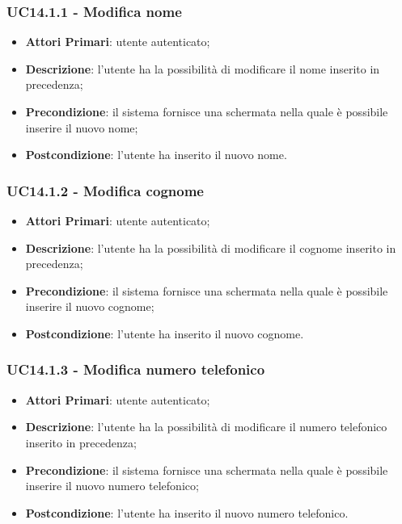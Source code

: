 \subsubsection{UC14.1.1 - Modifica nome}
\begin{itemize}
	\item \textbf{Attori Primari}: utente autenticato;
	\item \textbf{Descrizione}: l'utente ha la possibilità di modificare il nome inserito in precedenza;
	\item \textbf{Precondizione}: il sistema fornisce una schermata nella quale è possibile inserire il nuovo nome;
	\item \textbf{Postcondizione}: l'utente ha inserito il nuovo nome.
\end{itemize}

\subsubsection{UC14.1.2 - Modifica cognome}
\begin{itemize}
	\item \textbf{Attori Primari}: utente autenticato;
	\item \textbf{Descrizione}: l'utente ha la possibilità di modificare il cognome inserito in precedenza;
	\item \textbf{Precondizione}: il sistema fornisce una schermata nella quale è possibile inserire il nuovo cognome;
	\item \textbf{Postcondizione}: l'utente ha inserito il nuovo cognome.
\end{itemize}

\subsubsection{UC14.1.3 - Modifica numero telefonico}
\begin{itemize}
	\item \textbf{Attori Primari}: utente autenticato;
	\item \textbf{Descrizione}: l'utente ha la possibilità di modificare il numero telefonico inserito in precedenza;
	\item \textbf{Precondizione}: il sistema fornisce una schermata nella quale è possibile inserire il nuovo numero telefonico;
	\item \textbf{Postcondizione}: l'utente ha inserito il nuovo numero telefonico.
\end{itemize}

